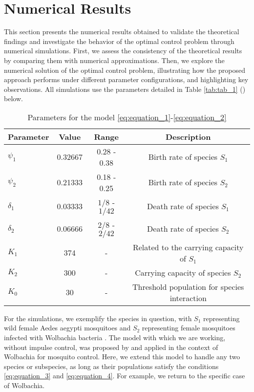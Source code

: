 \documentclass[10pt,letterpaper]{article}
\begin{document}
\section{Numerical Results}\label{sec:numericalresults}

This section presents the numerical results obtained to validate the theoretical findings and investigate the behavior of the optimal control problem through numerical simulations. First, we assess the consistency of the theoretical results by comparing them with numerical approximations. Then, we explore the numerical solution of the optimal control problem, illustrating how the proposed approach performs under different parameter configurations, and highlighting key observations. All simulations use the parameters detailed in Table \eqref{tab:tab_1} (\cite{Campo2017}) below.

\begin{table}[htpb]
\centering
{\footnotesize
\caption{Parameters for the model \eqref{eq:equation_1}-\eqref{eq:equation_2}}\label{tab:tab_1}
\begin{tabular}{lccc}
\toprule
\textbf{Parameter} & \textbf{Value} & \textbf{Range} & \textbf{Description} \\
\midrule
$\psi_1$ & 0.32667 & 0.28 - 0.38 & Birth rate of species $S_1$ \\
$\psi_2$ & 0.21333 & 0.18 - 0.25 & Birth rate of species $S_2$ \\
$\delta_1$ & 0.03333 & $1/8$ - $1/42$ & Death rate of species $S_1$ \\
$\delta_2$ & 0.06666 & $2/8$ - $2/42$ & Death rate of species $S_2$ \\
$K_1$ & 374 & - & Related to the carrying capacity of $S_1$ \\
$K_2$ & 300 & - & Carrying capacity of species $S_2$ \\
$K_0$ & 30 & - & Threshold population for species interaction \\
\bottomrule
\end{tabular}}
\end{table}

For the simulations, we exemplify the species in question, with $S_1$ representing wild female Aedes aegypti mosquitoes and $S_2$ representing female mosquitoes infected with Wolbachia bacteria \cite{almeida2019mosquitoW5,cardona2020wolbachiaW7,zara2016estrategiasW2}. The model with which we are working, without impulse control, was proposed by \cite{Campo2017} and applied in the context of Wolbachia for mosquito control. Here, we extend this model to handle any two species or subspecies, as long as their populations satisfy the conditions \eqref{eq:equation_3} and \eqref{eq:equation_4}. For example, we return to the specific case of Wolbachia.
\end{document}
